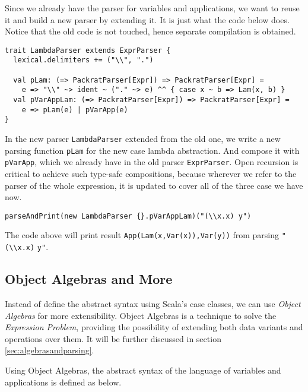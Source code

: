Since we already have the parser for variables and applications, we want to reuse it and build a new parser by extending it. It is just what the code below does. Notice that the old code is not touched, hence separate compilation is obtained.

\begin{lstlisting}
trait LambdaParser extends ExprParser {
  lexical.delimiters += ("\\", ".")

  val pLam: (=> PackratParser[Expr]) => PackratParser[Expr] =
    e => "\\" ~> ident ~ ("." ~> e) ^^ { case x ~ b => Lam(x, b) }
  val pVarAppLam: (=> PackratParser[Expr]) => PackratParser[Expr] =
    e => pLam(e) | pVarApp(e)
}
\end{lstlisting}

In the new parser \lstinline{LambdaParser} extended from the old one, we write a new parsing function \lstinline{pLam} for the new case lambda abstraction. And compose it with \lstinline{pVarApp}, which we already have in the old parser \lstinline{ExprParser}. Open recursion is critical to achieve such type-safe compositions, because wherever we refer to the parser of the whole expression, it is updated to cover all of the three case we have now.

\begin{lstlisting}
parseAndPrint(new LambdaParser {}.pVarAppLam)("(\\x.x) y")
\end{lstlisting}

The code above will print result \lstinline{App(Lam(x,Var(x)),Var(y))} from parsing \lstinline{"(\\x.x)} \lstinline{y"}.

\subsection{Object Algebras and More}\label{subsec:overview-oa}

Instead of define the abstract syntax using Scala's case classes, we can use \textit{Object Algebras} for more extensibility. Object Algebras is a technique to solve the \textit{Expression Problem}, providing the possibility of extending both data variants and operations over them. It will be further discussed in section \ref{sec:algebrasandparsing}.

Using Object Algebras, the abstract syntax of the language of variables and applications is defined as below.

